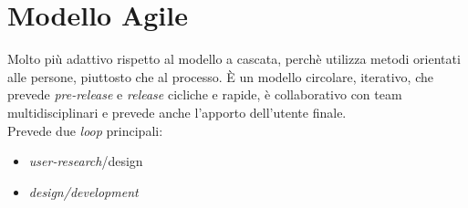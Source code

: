 \section{Modello Agile}
Molto pi\`u adattivo rispetto al modello a cascata, perch\`e utilizza metodi orientati alle persone, piuttosto che al processo. \`E un modello circolare, iterativo, che prevede \textit{pre-release} e \textit{release} cicliche e rapide, \`e collaborativo con team multidisciplinari e prevede anche l'apporto dell'utente finale. \\
Prevede due \textit{loop} principali:
\begin{itemize}
	\item \textit{user-research}/design
	\item \textit{design/development}
\end{itemize}